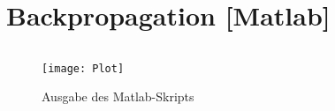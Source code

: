 \documentclass[DIN, pagenumber=false, fontsize=11pt, parskip=half]{scrartcl}
\begin{document}
    \section{Backpropagation [Matlab]}
    \subsection{}
    
    \subsection{}
    
    \subsection{}
    
    
    \subsection{}
    
    \subsection{}
    
    \begin{figure}[H]
        \centering
        \texttt{[image: Plot]}
        \caption{Ausgabe des Matlab-Skripts} 
    \end{figure}
\end{document}
